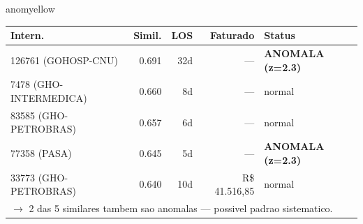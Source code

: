 \documentclass[a4paper,10pt]{article}
\begin{document}
\begin{anomalycard}[Internacao 14919 | GHO-PETROBRAS | MODERADO (z=2.04)]{anomyellow}
\begin{tabular}{l r r r l}\toprule\textbf{Intern.} & \textbf{Simil.} & \textbf{LOS} & \textbf{Faturado} & \textbf{Status} \\\midrule
126761 (GOHOSP-CNU) & 0.691 & 32d & --- & \textcolor{anomred}{\textbf{ANOMALA (z=2.3)}} \\
7478 (GHO-INTERMEDICA) & 0.660 & 8d & --- & \textcolor{jcubeblue}{normal} \\
83585 (GHO-PETROBRAS) & 0.657 & 6d & --- & \textcolor{jcubeblue}{normal} \\
77358 (PASA) & 0.645 & 5d & --- & \textcolor{anomred}{\textbf{ANOMALA (z=2.3)}} \\
33773 (GHO-PETROBRAS) & 0.640 & 10d & R\$ 41.516,85 & \textcolor{jcubeblue}{normal} \\
\multicolumn{5}{l}{\textcolor{anomred}{\small $\rightarrow$ 2 das 5 similares tambem sao anomalas --- possivel padrao sistematico.}} \\
\bottomrule\end{tabular}


\end{anomalycard}

\newpage
\end{document}
